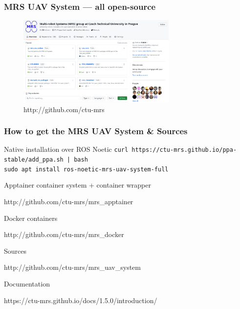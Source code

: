 \documentclass[aspectratio=169,9pt]{beamer}
\begin{document}


\begin{frame}
  \frametitle{MRS UAV System --- all open-source}

  \begin{figure}
    \centering
    \includegraphics[width=0.7\textwidth]{./fig/github.png}
    \huge {\color{blue} http://github.com/ctu-mrs}
  \end{figure}

\end{frame}



\begin{frame}
  \frametitle{How to get the MRS UAV System \& Sources}

  \begin{block}{Native installation over ROS Noetic}
    \texttt{curl https://ctu-mrs.github.io/ppa-stable/add\_ppa.sh | bash}\\
    \texttt{sudo apt install ros-noetic-mrs-uav-system-full}
  \end{block}

  \begin{block}{Apptainer container system + container wrapper}
    \begin{center}
      \large {\color{blue} http://github.com/ctu-mrs/mrs\_apptainer}
    \end{center}
  \end{block}

  \begin{block}{Docker containers}
    \begin{center}
      \large {\color{blue} http://github.com/ctu-mrs/mrs\_docker}
    \end{center}
  \end{block}

  \begin{block}{Sources}
    \begin{center}
      \large {\color{blue} http://github.com/ctu-mrs/mrs\_uav\_system}
    \end{center}
  \end{block}

  \begin{block}{Documentation}
    \begin{center}
      \large {\color{blue} https://ctu-mrs.github.io/docs/1.5.0/introduction/}
    \end{center}
  \end{block}

\end{frame}
\end{document}
